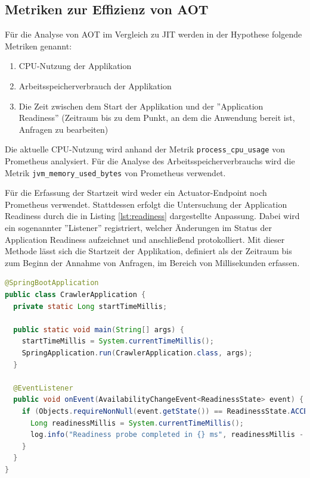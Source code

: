\subsection{Metriken zur Effizienz von \acl{AOT}}\label{subsec:metrikefficience}
Für die Analyse von \ac{AOT} im Vergleich zu \ac{JIT} werden in der Hypothese \textit{} folgende Metriken genannt:
\begin{enumerate}
    \item CPU-Nutzung der Applikation
    \item Arbeitsspeicherverbrauch der Applikation
    \item Die Zeit zwischen dem Start der Applikation und der ''Application Readiness'' (Zeitraum bis zu dem Punkt, an dem die Anwendung bereit ist, Anfragen zu bearbeiten)
\end{enumerate}

Die aktuelle CPU-Nutzung wird anhand der Metrik \lstinline{process_cpu_usage} von Prometheus analysiert. 
Für die Analyse des Arbeitsspeicherverbrauchs wird die Metrik \lstinline{jvm_memory_used_bytes} von Prometheus verwendet.

Für die Erfassung der Startzeit wird weder ein Actuator-Endpoint noch Prometheus verwendet. Stattdessen erfolgt die Untersuchung der Application Readiness durch die in Listing \ref{lst:readiness} dargestellte Anpassung. Dabei wird ein sogenannter ''Listener'' registriert, welcher Änderungen im Status der Application Readiness aufzeichnet und anschließend protokolliert. Mit dieser Methode lässt sich die Startzeit der Applikation, definiert als der Zeitraum bis zum Beginn der Annahme von Anfragen, im Bereich von Millisekunden erfassen.

\begin{lstlisting}[language=Java, caption={Code zur Analyse der Application Readiness am Beispiel des Crawler Services.},label={lst:readiness}]
@SpringBootApplication
public class CrawlerApplication {
  private static Long startTimeMillis;

  public static void main(String[] args) {
    startTimeMillis = System.currentTimeMillis();
    SpringApplication.run(CrawlerApplication.class, args);
  }

  @EventListener
  public void onEvent(AvailabilityChangeEvent<ReadinessState> event) {
    if (Objects.requireNonNull(event.getState()) == ReadinessState.ACCEPTING_TRAFFIC) {
      Long readinessMillis = System.currentTimeMillis();
      log.info("Readiness probe completed in {} ms", readinessMillis - startTimeMillis);
    }
  }
}
\end{lstlisting}
\newpage
